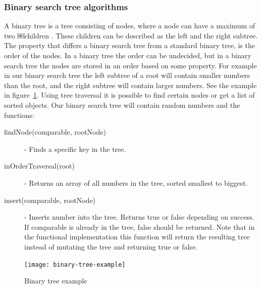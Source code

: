 \documentclass {article}
\begin{document}
\subsubsection{Binary search tree algorithms}
\label{sec:binary-tree}
A binary tree is a tree consisting of nodes, where a node can have a maximum of two ￼children \cite{weiss}. These children can be described as the left and the right subtree. The property that differs a binary search tree from a standard binary tree, is the order of the nodes. In a binary tree the order can be undecided, but in a binary search tree the nodes are stored in an order based on some property. For example in our binary search tree the left subtree of a root will contain smaller numbers than the root, and the right subtree will contain larger numbers. See the example in figure~\ref{fig:binary-tree-example}. Using tree traversal it is possible to find certain nodes or get a list of sorted objects. Our binary search tree will contain random numbers and the functions:
\begin{description}
\item [findNode(comparable, rootNode)] - Finds a specific key in the tree.
\item [inOrderTraversal(root)] - Returns an array of all numbers in the tree, sorted smallest to biggest.
\item [insert(comparable, rootNode)] - Inserts number into the tree. Returns true or false depending on success. If comparable is already in the tree, false should be returned. Note that in the functional implementation this function will return the resulting tree instead of mutating the tree and returning true or false.
\end{description}
 
\begin{figure}[H]
\texttt{[image: binary-tree-example]}
 

\caption {Binary tree example}
\label{fig:binary-tree-example}
\end {figure}
 
\end{document}
